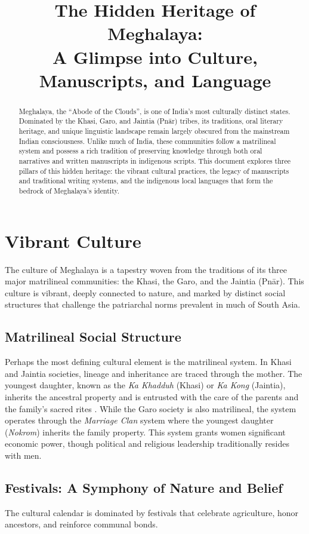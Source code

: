 \documentclass[12pt]{article}
\title{The Hidden Heritage of Meghalaya:\\
A Glimpse into Culture, Manuscripts, and Language}
\author{}
\date{}
\begin{document}
\maketitle

\begin{abstract}
Meghalaya, the \enquote{Abode of the Clouds}, is one of India's most culturally distinct states. Dominated by the Khasi, Garo, and Jaintia (Pnār) tribes, its traditions, oral literary heritage, and unique linguistic landscape remain largely obscured from the mainstream Indian consciousness. Unlike much of India, these communities follow a matrilineal system and possess a rich tradition of preserving knowledge through both oral narratives and written manuscripts in indigenous scripts. This document explores three pillars of this hidden heritage: the vibrant cultural practices, the legacy of manuscripts and traditional writing systems, and the indigenous local languages that form the bedrock of Meghalaya's identity.
\end{abstract}

\section{Vibrant Culture}
The culture of Meghalaya is a tapestry woven from the traditions of its three major matrilineal communities: the Khasi, the Garo, and the Jaintia (Pnār). This culture is vibrant, deeply connected to nature, and marked by distinct social structures that challenge the patriarchal norms prevalent in much of South Asia.

\subsection{Matrilineal Social Structure}
Perhaps the most defining cultural element is the matrilineal system. In Khasi and Jaintia societies, lineage and inheritance are traced through the mother. The youngest daughter, known as the \textit{Ka Khadduh} (Khasi) or \textit{Ka Kong} (Jaintia), inherits the ancestral property and is entrusted with the care of the parents and the family's sacred rites \citep{Chaki-Sircar1984}. While the Garo society is also matrilineal, the system operates through the \textit{Marriage Clan} system where the youngest daughter (\textit{Nokrom}) inherits the family property. This system grants women significant economic power, though political and religious leadership traditionally resides with men.

\subsection{Festivals: A Symphony of Nature and Belief}
The cultural calendar is dominated by festivals that celebrate agriculture, honor ancestors, and reinforce communal bonds.
\end{document}
